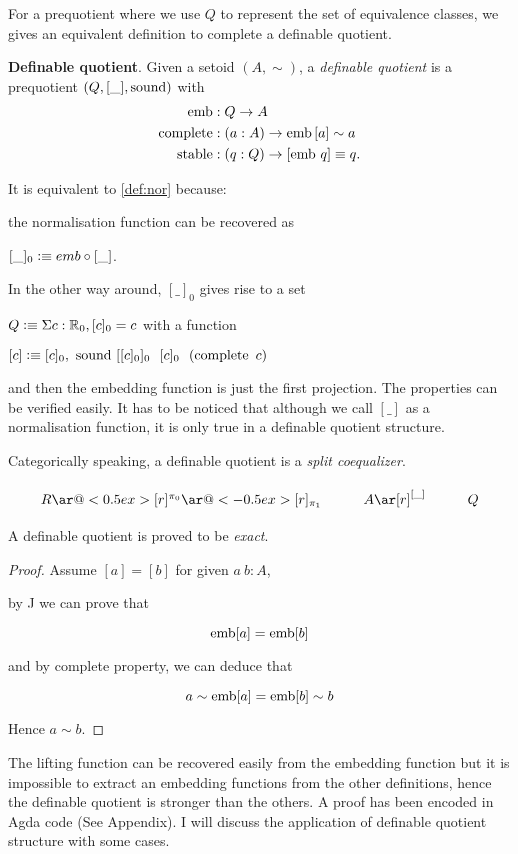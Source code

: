 For a prequotient where we use $Q$ to represent the set of equivalence classes, we gives an equivalent definition to complete a definable quotient.

\begin{definition} \textbf{Definable quotient}.
\noindent
Given a setoid $(A,\sim)$, a \emph{definable quotient} is a
prequotient $(Q, [\_], \operatorname{sound})$ with 
\begin{align*}
\operatorname{emb} &: Q \rightarrow A\\
\operatorname{complete} &: (a : A) \rightarrow \operatorname{emb} {[a]} \sim a\\
\operatorname{stable} &: (q:Q) \rightarrow [\operatorname{emb}\,q] \equiv q.
\end{align*}
\end{definition}

It is equivalent to \autoref{def:nor} because:

the normalisation function can be recovered as 

$[\_]_0 \vcentcolon\equiv emb \circ [\_]$. 

In the other way around, $[\_]_0$ gives rise to a set 

$Q \vcentcolon\equiv \Sigma c : \mathbb{R}_0, [ c ]_0 = c$ with a function 

$[ c ] \vcentcolon\equiv [c]_0 , ~\operatorname{sound} ~ [[c]_0]_0 ~~ [c]_0~~ (\operatorname{complete} ~ c)$

 and then the embedding function is just the first projection. The properties can be verified easily. It has to be noticed that although we call $[\_]$ as a normalisation function, it is only true in a definable quotient structure.

Categorically speaking, a definable quotient is a \emph{split coequalizer}.

\[\xymatrix{
R\ar@<0.5ex>[r]^{\pi_0}\ar@<-0.5ex>[r]_{\pi_1}& A\ar[r]^{[\_]}
& Q
}\]

A definable quotient is proved to be \emph{exact}.

\begin{proof}
Assume $[ a ] = [ b ]$ for given $a ~b : A$,

by J we can prove that

$$\operatorname{emb} [ a ] = \operatorname{emb} [ b ]$$

and by complete property, we can deduce that

$$a \sim \operatorname{emb} [ a ] = \operatorname{emb} [ b ] \sim b$$

Hence $a \sim b$.
\end{proof}

The lifting function can be recovered easily from the embedding function but it is impossible to extract an embedding functions from the other definitions, hence the definable quotient is stronger than the others. A proof has been encoded in Agda code (See Appendix). I will discuss the application of definable quotient structure with some cases.

